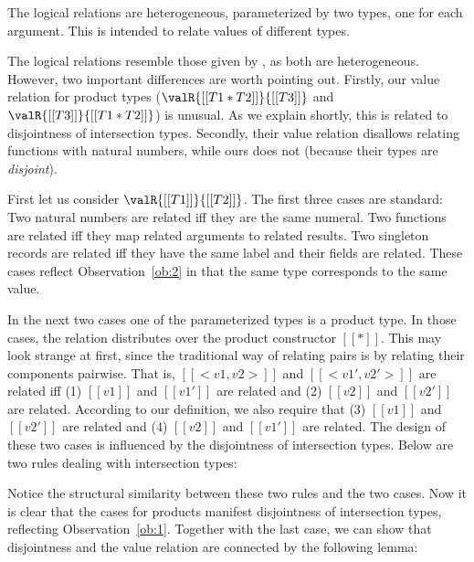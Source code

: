 \begin{remark}
  The logical relations are heterogeneous, parameterized by two types, one for
  each argument. This is intended to relate values of different types.
\end{remark}


\begin{remark}
  The logical relations resemble those given by \citet{biernacki2015logical}, as
  both are heterogeneous. However, two important differences are worth pointing
  out. Firstly, our value relation for product types ($\valR{[[T1 * T2]]}{[[T3]]}$ and $\valR{[[T3]]}{[[T1 * T2]]}$) is unusual. As we explain
  shortly, this is related to disjointness of intersection types. Secondly,
  their value relation disallows relating functions with natural numbers, while
  ours does not (because their types are \textit{disjoint}).
\end{remark}


First let us consider $\valR{[[T1]]}{[[T2]]}$. The first three cases are
standard: Two natural numbers are related iff they are the same numeral. Two
functions are related iff they map related arguments to related results. Two
singleton records are related iff they have the same label and their fields are
related. These cases reflect Observation~\ref{ob:2} in that the same type
corresponds to the same value.

In the next two cases one of the parameterized types is a product type. In those
cases, the relation distributes over the product constructor $[[*]]$. This may
look strange at first, since the traditional way of relating pairs is by
relating their components pairwise. That is, $[[<v1,v2>]]$ and $[[<v1', v2'>]]$
are related iff (1) $[[v1]]$ and $[[v1']]$ are related and (2) $[[v2]]$ and
$[[v2']]$ are related. According to our definition, we also require that (3)
$[[v1]]$ and $[[v2']]$ are related and (4) $[[v2]]$ and $[[v1']]$ are related.
The design of these two cases is influenced by the disjointness of intersection
types. Below are two rules dealing with intersection types:
Notice the structural similarity between these two rules and the two cases. Now
it is clear that the cases for products manifest disjointness of intersection
types, reflecting Observation~\ref{ob:1}. Together with the last case, we can
show that disjointness and the value relation are connected by the following
lemma:

